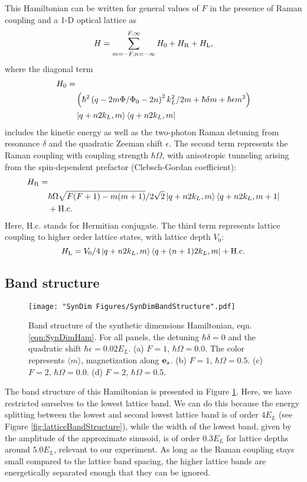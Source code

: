 This Hamiltonian can be written for general values of $F$ in the presence of Raman coupling and a 1-D optical lattice as
\begin{equation*}
H = \sum _{m=-F,n=-\infty}^{F,\infty}H_{0}+H_{\rm{R}}+H_{\rm{L}},
\label{eqn:SynDimHamiltonian}
\end{equation*}
where the diagonal term
\begin{eqnarray*}
H_{0} =&\\
&\left(\hbar^2\left(q-2m\Phi/\Phi_0-2n\right)^2 k_L^2/2m+\hbar\delta m+\hbar\epsilon m^2 \right)\\
&\mathinner{|{q+n2k_L,m}\rangle}\mathinner{\langle{q+n2k_L,m}|}
\end{eqnarray*}
includes the kinetic energy as well as the two-photon Raman detuning from resonance $\delta$ and the quadratic Zeeman shift $\epsilon$. The second term represents the Raman coupling  with coupling strength $\hbar\Omega$, with anisotropic tunneling arising from the spin-dependent prefactor (Clebsch-Gordan coefficient):
\begin{eqnarray*}
H_{\rm{R}} =&\\
&\hbar\Omega\sqrt{F(F+1)-m(m+1)}/2\sqrt{2}\mathinner{|{q+n2k_L,m}\rangle}\mathinner{\langle{q+n2k_L,m+1}|}\\
&+\rm{H.c.}
\end{eqnarray*}
Here,  H.c. stands for Hermitian conjugate. The third term represents lattice coupling to higher order lattice states, with lattice depth $V_0$: 
\begin{equation*}
H_{\rm{L}} = V_0/4\mathinner{|{q+n2k_L,m}\rangle}\mathinner{\langle{q+(n+1)2k_L,m}|} +\rm{H.c.}
\end{equation*}

\subsection{Band structure}\label{sec:SynDimBandStructure}
\begin{figure}
	\texttt{[image: "SynDim Figures/SynDimBandStructure".pdf]}
\caption[Band structure of the synthetic dimensions Hamiltonian]{Band structure of the synthetic dimensions Hamiltonian, eqn. \ref{eqn:SynDimHam}. For all panels, the detuning $\hbar\delta=0$ and the quadratic shift $\hbar\epsilon=0.02 E_L$. (a) $F=1$, $\hbar\Omega=0.0$. The color represents $\langle m\rangle$, magnetization along $\textbf{e}_s{}$. (b) $F=1$, $\hbar\Omega=0.5$. (c) $F=2$, $\hbar\Omega=0.0$. (d) $F=2$, $\hbar\Omega=0.5$. }
\label{fig:SynDimBandStruct}
\end{figure}

The band structure of this Hamiltonian is presented in Figure \ref{fig:SynDimBandStruct}. Here, we have restricted ourselves to the lowest lattice band. We can do this because the energy splitting between the lowest and second lowest lattice band is of order $4 E_L$ (see Figure \ref{fig:latticeBandStructure}), while the width of the lowest band, given by the amplitude of the approximate sinusoid, is of order $0.3 E_L$ for lattice depths around $5.0 E_L$, relevant to our experiment. As long as the Raman coupling stays small compared to the lattice band spacing, the higher lattice bands are energetically separated enough that they can be ignored. 

